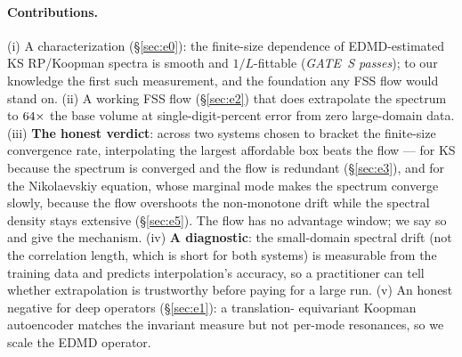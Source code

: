 \documentclass[11pt]{article}
\begin{document}
\paragraph{Contributions.}
(i) A characterization (\S\ref{sec:e0}): the finite-size dependence of
EDMD-estimated KS RP/Koopman spectra is smooth and $1/L$-fittable
(\emph{GATE~S passes}); to our knowledge the first such measurement, and the
foundation any FSS flow would stand on. (ii) A working FSS flow (\S\ref{sec:e2})
that does extrapolate the spectrum to $64\times$ the base volume at
single-digit-percent error from zero large-domain data. (iii) \textbf{The honest
verdict}: across two systems chosen to bracket the finite-size convergence rate,
interpolating the largest affordable box beats the flow --- for KS because the
spectrum is converged and the flow is redundant (\S\ref{sec:e3}), and for the
Nikolaevskiy equation, whose marginal mode makes the spectrum converge slowly,
because the flow overshoots the non-monotone drift while the spectral density
stays extensive (\S\ref{sec:e5}). The flow has no advantage window; we say so and
give the mechanism. (iv) \textbf{A diagnostic}: the small-domain spectral drift
(not the correlation length, which is short for both systems) is measurable from
the training data and predicts interpolation's accuracy, so a practitioner can
tell whether extrapolation is trustworthy before paying for a large run.
(v) An honest negative for deep operators (\S\ref{sec:e1}): a translation-
equivariant Koopman autoencoder matches the invariant measure but not per-mode
resonances, so we scale the EDMD operator.
\end{document}
